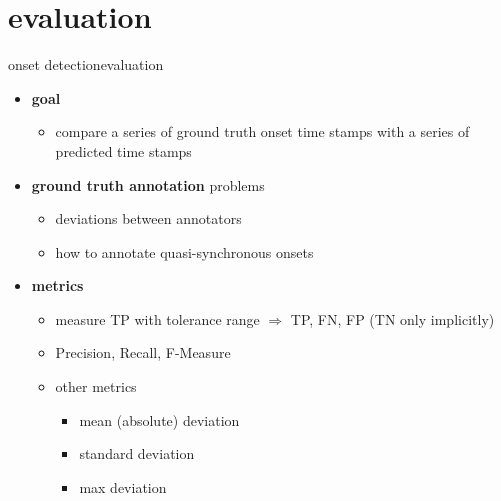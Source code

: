     \section[eval]{evaluation}
        \begin{frame}{onset detection}{evaluation}
            \begin{itemize}
                \item   \textbf{goal}
                    \begin{itemize}
                        \item   compare a series of ground truth onset time stamps with a series of predicted time stamps
                    \end{itemize}
                \smallskip
                \item<2->   \textbf{ground truth annotation} problems
                    \begin{itemize}
                        \item   deviations between annotators
                        \item   how to annotate quasi-synchronous onsets
                    \end{itemize}
                \smallskip
                \item<3->   \textbf{metrics}
                    \begin{itemize}
                        \item   measure TP with tolerance range $\Rightarrow$ TP, FN, FP (TN only implicitly)
                        \item   Precision, Recall, F-Measure
                        \item   other metrics
                            \begin{itemize}
                                \item   mean (absolute) deviation
                                \item   standard deviation
                                \item   max deviation
                            \end{itemize}
                    \end{itemize}
            \end{itemize}
        \end{frame}

    
